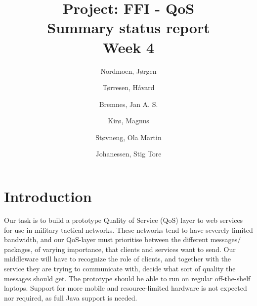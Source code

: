 \documentclass[titlepage]{article}
\title{Project: FFI - QoS \\ Summary status report \\ Week 4}
\author{Nordmoen, Jørgen \and Tørresen, Håvard \and Bremnes, Jan A. S.  \and Kirø, Magnus  \and Støvneng, Ola Martin  \and Johanessen, Stig Tore}
\begin{document}
    \maketitle
    \newpage
      
    \section*{Introduction}
        Our task is to build a prototype Quality of Service (QoS) layer to web services for use in military tactical networks. These networks tend to have severely limited bandwidth, and our QoS-layer must prioritise between the different messages$/$packages, of varying importance, that clients and services want to send. Our middleware will have to recognize the role of clients, and together with the service they are trying to communicate with, decide what sort of quality the messages should get.
The prototype should be able to run on regular off-the-shelf laptops. Support for more mobile and resource-limited hardware is not expected nor required, as full Java support is needed.
\end{document}
